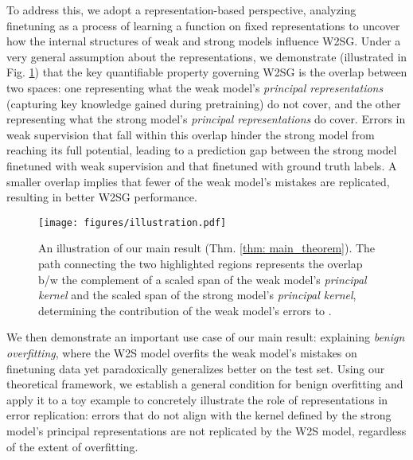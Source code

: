 To address this, we adopt a representation-based perspective, analyzing finetuning as a process of learning a function on fixed representations to uncover how the internal structures of weak and strong models influence W2SG. Under a very general assumption about the representations, we demonstrate (illustrated in Fig. \ref{fig: illustration}) that the key quantifiable property governing W2SG is the overlap between two spaces: one representing what the weak model's \emph{principal representations} (capturing key knowledge gained during pretraining) do not cover, and the other representing what the strong model's \emph{principal representations} do cover. Errors in weak supervision that fall within this overlap hinder the strong model from reaching its full potential, leading to a prediction gap between the strong model finetuned with weak supervision and that finetuned with ground truth labels.
A smaller overlap implies that fewer of the weak model's mistakes are replicated, resulting in better W2SG performance.

\begin{figure}[!t]
    \centering
\texttt{[image: figures/illustration.pdf]}
    \caption{An illustration of our main result (Thm. \ref{thm: main_theorem}).
The path connecting the two highlighted regions represents the overlap b/w the complement of a scaled span of the weak model's \emph{principal kernel} and the scaled span of the strong model's \emph{principal kernel}, determining the contribution of the weak model's errors to \predgap{}.
}
    \label{fig: illustration}
\end{figure}


We then demonstrate an important use case of our main result: explaining \emph{benign overfitting}, where the W2S model overfits the weak model's mistakes on finetuning data yet paradoxically generalizes better on the test set. Using our theoretical framework, we establish a general condition for benign overfitting and apply it to a toy example to concretely illustrate the role of representations in error replication: errors that do not align with the kernel defined by the strong model's principal representations are not replicated by the W2S model, regardless of the extent of overfitting.  


